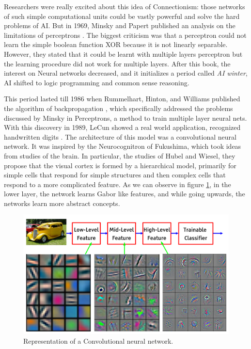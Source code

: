 Researchers were really excited about this idea of Connectionism: those networks of such simple computational units could be vastly powerful and solve the hard problems of AI. But in 1969, Minsky and Papert  published an analysis on the limitations of perceptrons \cite{minsky69perceptrons}. The biggest criticism was that a perceptron could not learn the simple boolean function XOR because it is not linearly separable. However, they stated that it could be learnt with multiple layers perceptron but the learning procedure did not work for multiple layers. After this book, the interest on Neural networks decreased, and it initializes a period called \textit{AI winter}, AI shifted to logic programming and common sense reasoning.

This period lasted till 1986 when Rummelhart, Hinton, and Williams published the algorithm of backpropagation \cite{Rumelhart}, which specifically addressed the problems discussed by Minsky in Perceptrons, a method to train multiple layer neural nets. With this discovery in 1989, LeCun showed a real world application, recognized handwritten digits \cite{lecunZip}. The architecture of this model was a convolutional neural network. It was inspired by the Neurocognitron \cite{Fukushima} of Fukushima, which took ideas from studies of the brain. In particular, the studies of Hubel and Wiesel, they propose that the visual cortex is formed by a hierarchical model, primarily for simple cells that respond for simple structures and then complex cells that respond to a more complicated feature. As we can observe in figure \ref{intro1}, in the lower layer, the network learns Gabor like features, and while going upwards, the networks learn more abstract concepts.




\begin{figure}[H]
\centering         
\includegraphics[width=12cm]{intro/model.png}
\caption{Representation of a Convolutional neural network.} \label{intro1}
\end{figure}



